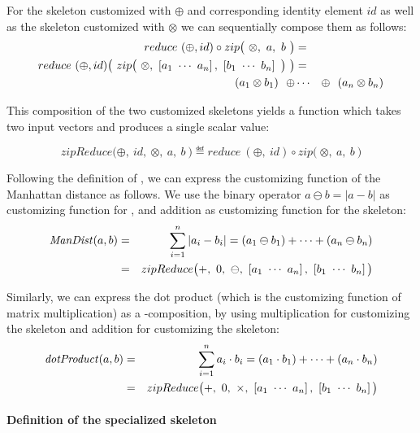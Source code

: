 For the \reduce skeleton customized with $\oplus$ and corresponding identity element $id$ as well as the \zip skeleton customized with $\otimes$ we can sequentially compose them as follows:
\begin{eqnarray*}
  reduce\ (\oplus, id) \circ zip\big(\ \otimes,\ a,\ b\ \big) &=&\\
  reduce\ (\oplus, id) \big(\ zip\big(\ \otimes,\ \DottedVector{a_1}{a_n},\ \DottedVector{b_1}{b_n}\ \big)\ \big) &=&\\
  (a_1 \otimes b_1)\ \ \oplus &\cdots& \oplus\ \ (a_n \otimes b_n)
\end{eqnarray*}

This composition of the two customized skeletons yields a function which takes two input vectors and produces a single scalar value:

\begin{equation*}
  zipReduce\big(\oplus,\ id,\ \otimes,\ a,\ b\ \big) \eqdef 
  reduce\ (\oplus,\ id) \circ zip\big(\ \otimes,\ a,\ b\ \big)
\end{equation*}

Following the definition of \zipReduce, we can express the customizing function of the Manhattan distance as follows.
We use the binary operator $a \ominus b = |a - b|$ as customizing function for \zip, and addition as customizing function for the \reduce skeleton:
\begin{eqnarray*}
    \ManDist(a, b) &=& \sum_{i=1}^{n} | a_i - b_i | = (a_1 \ominus b_1) + \cdots + (a_n \ominus b_n)\\
    &=& zipReduce\big(+,\ 0,\ \ominus,\ \DottedVector{a_1}{a_n},\ \DottedVector{b_1}{b_n}\big)
\end{eqnarray*}

Similarly, we can express the dot product (which is the customizing function of matrix multiplication) as a \zip-\reduce composition, by using multiplication for customizing the \zip skeleton and addition for customizing the \reduce skeleton:
\begin{eqnarray*}
  \dotProduct(a, b) &=& \sum_{i = 1}^{n} a_i \cdot b_i = (a_1 \cdot b_1) + \cdots + (a_n \cdot b_n)\\
  &=& zipReduce\big(+,\ 0,\ \times,\ \DottedVector{a_1}{a_n},\ \DottedVector{b_1}{b_n}\big)
\end{eqnarray*}

\paragraph{Definition of the specialized \allpairs skeleton}

